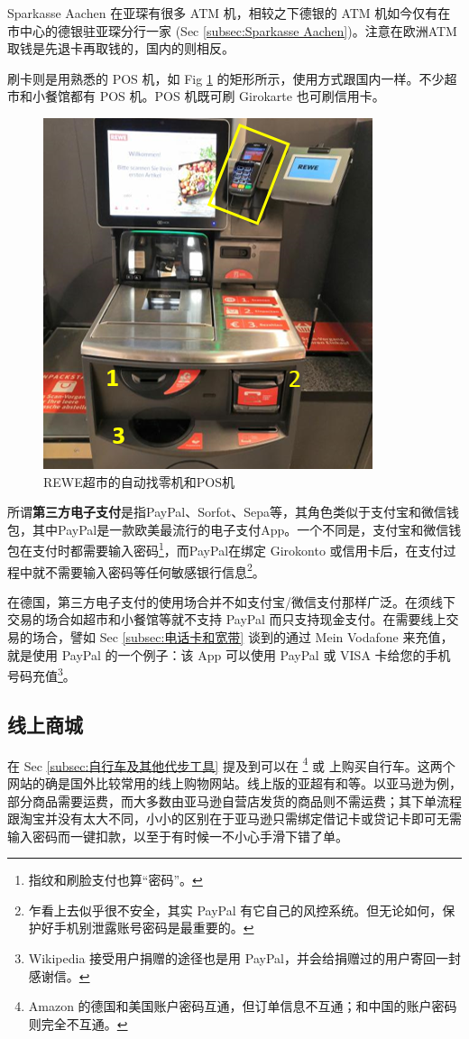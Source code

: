     Sparkasse Aachen 在亚琛有很多 ATM 机，相较之下德银的 ATM 机如今仅有在市中心的德银驻亚琛分行一家 (Sec \ref{subsec:Sparkasse Aachen})。注意在欧洲ATM取钱是先退卡再取钱的，国内的则相反。

    刷卡则是用熟悉的 POS 机，如 Fig \ref{fig:REWE超市的自动找零机和POS机} 的矩形所示，使用方式跟国内一样。不少超市和小餐馆都有 POS 机。POS 机既可刷 Girokarte 也可刷信用卡。

    \begin{figure}[ht]
      \centering
      \includegraphics[width=.4\textwidth]{在亚琛学习和生活/日常消费和饮食/REWE超市的自动找零机和POS机.png}
      \caption{REWE超市的自动找零机和POS机}
      \label{fig:REWE超市的自动找零机和POS机}
    \end{figure}

    所谓\textbf{第三方电子支付}是指PayPal、Sorfot、Sepa等，其角色类似于支付宝和微信钱包，其中PayPal是一款欧美最流行的电子支付App。一个不同是，支付宝和微信钱包在支付时都需要输入密码\footnote{指纹和刷脸支付也算``密码''。}，而PayPal在绑定 Girokonto 或信用卡后，在支付过程中就不需要输入密码等任何敏感银行信息\footnote{乍看上去似乎很不安全，其实 PayPal 有它自己的风控系统。但无论如何，保护好手机别泄露账号密码是最重要的。}。

    在德国，第三方电子支付的使用场合并不如支付宝/微信支付那样广泛。在须线下交易的场合如超市和小餐馆等就不支持 PayPal 而只支持现金支付。在需要线上交易的场合，譬如 Sec \ref{subsec:电话卡和宽带} 谈到的通过 Mein Vodafone 来充值，就是使用 PayPal 的一个例子：该 App 可以使用 PayPal 或 VISA 卡给您的手机号码充值\footnote{Wikipedia 接受用户捐赠的途径也是用 PayPal，并会给捐赠过的用户寄回一封感谢信。}。

  \subsection{线上商城}\label{subsec:线上商城}

    在 Sec \ref{subsec:自行车及其他代步工具} 提及到可以在 \href{https://amazon.de/}{}\footnote{Amazon 的德国和美国账户密码互通，但订单信息不互通；和中国的账户密码则完全不互通。} 或 \href{https://www.ebay.de/}{} 上购买自行车。这两个网站的确是国外比较常用的线上购物网站。线上版的亚超有\href{https://www.yachao.de/}{}和\href{https://www.yachaoonline.com/index.php}{}等。以亚马逊为例，部分商品需要运费，而大多数由亚马逊自营店发货的商品则不需运费；其下单流程跟淘宝并没有太大不同，小小的区别在于亚马逊只需绑定借记卡或贷记卡即可无需输入密码而一键扣款，以至于有时候一不小心手滑下错了单。

